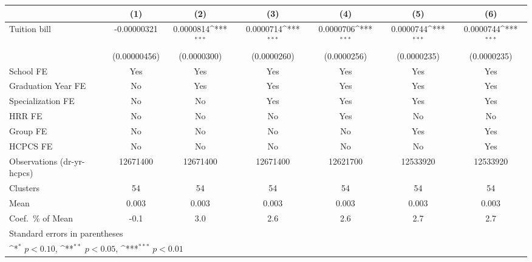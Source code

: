 {
\def\sym#1{\ifmmode^{#1}\else\(^{#1}\)\fi}
\begin{tabular}{l*{6}{c}}
\hline\hline
                    &\multicolumn{1}{c}{(1)}         &\multicolumn{1}{c}{(2)}         &\multicolumn{1}{c}{(3)}         &\multicolumn{1}{c}{(4)}         &\multicolumn{1}{c}{(5)}         &\multicolumn{1}{c}{(6)}         \\
\hline
Tuition bill        & -0.00000321         &   0.0000814\sym{***}&   0.0000714\sym{***}&   0.0000706\sym{***}&   0.0000744\sym{***}&   0.0000744\sym{***}\\
                    &(0.00000456)         & (0.0000300)         & (0.0000260)         & (0.0000256)         & (0.0000235)         & (0.0000235)         \\
[1em]
School FE           &         Yes         &         Yes         &         Yes         &         Yes         &         Yes         &         Yes         \\
[1em]
Graduation Year FE  &          No         &         Yes         &         Yes         &         Yes         &         Yes         &         Yes         \\
[1em]
Specialization FE   &          No         &          No         &         Yes         &         Yes         &         Yes         &         Yes         \\
[1em]
HRR FE              &          No         &          No         &          No         &         Yes         &          No         &          No         \\
[1em]
Group FE            &          No         &          No         &          No         &          No         &         Yes         &         Yes         \\
[1em]
HCPCS FE            &          No         &          No         &          No         &          No         &          No         &         Yes         \\
\hline
Observations (dr-yr-hcpcs)&    12671400         &    12671400         &    12671400         &    12621700         &    12533920         &    12533920         \\
Clusters            &          54         &          54         &          54         &          54         &          54         &          54         \\
Mean                &       0.003         &       0.003         &       0.003         &       0.003         &       0.003         &       0.003         \\
Coef.\ \% of Mean   &        -0.1         &         3.0         &         2.6         &         2.6         &         2.7         &         2.7         \\
\hline\hline
\multicolumn{7}{l}{\footnotesize Standard errors in parentheses}\\
\multicolumn{7}{l}{\footnotesize \sym{*} \(p<0.10\), \sym{**} \(p<0.05\), \sym{***} \(p<0.01\)}\\
\end{tabular}
}
